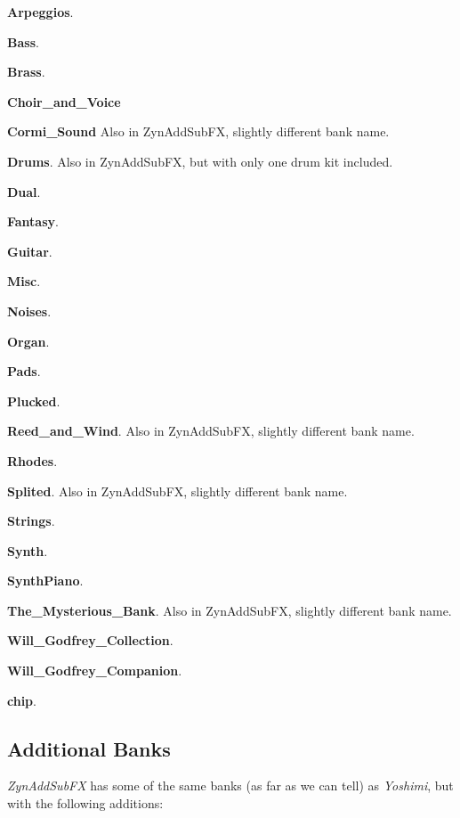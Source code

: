    \begin{enumber}
      \item \textbf{Arpeggios}.
      \item \textbf{Bass}.
      \item \textbf{Brass}.
      \item \textbf{Choir\_and\_Voice}
      \item \textbf{Cormi\_Sound}
         Also in ZynAddSubFX, slightly different bank name.
      \item \textbf{Drums}.
         Also in ZynAddSubFX, but with only one drum kit included.
      \item \textbf{Dual}.
      \item \textbf{Fantasy}.
      \item \textbf{Guitar}.
      \item \textbf{Misc}.
      \item \textbf{Noises}.
      \item \textbf{Organ}.
      \item \textbf{Pads}.
      \item \textbf{Plucked}.
      \item \textbf{Reed\_and\_Wind}.
         Also in ZynAddSubFX, slightly different bank name.
      \item \textbf{Rhodes}.
      \item \textbf{Splited}.
         Also in ZynAddSubFX, slightly different bank name.
      \item \textbf{Strings}.
      \item \textbf{Synth}.
      \item \textbf{SynthPiano}.
      \item \textbf{The\_Mysterious\_Bank}.
         Also in ZynAddSubFX, slightly different bank name.
      \item \textbf{Will\_Godfrey\_Collection}.
      \item \textbf{Will\_Godfrey\_Companion}.
      \item \textbf{chip}.
   \end{enumber}

\subsection{Additional Banks}
\label{subsec:banks_collection_additional}

   \textsl{ZynAddSubFX} has some of the same
   banks (as far as we can tell) as \textsl{Yoshimi}, but with the following
   additions:

